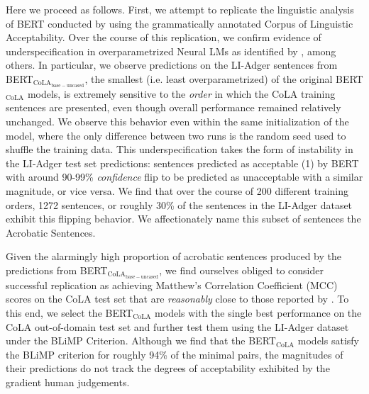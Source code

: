 Here we proceed as follows. First, we attempt to replicate the linguistic analysis of BERT conducted by \citet{warstadt2020can} using the grammatically annotated Corpus of Linguistic Acceptability.  Over the course of this replication, we confirm evidence of underspecification in overparametrized Neural LMs as identified by \citet{d2020underspecification,mccoy2019berts}, among others.  In particular, we observe predictions on the LI-Adger sentences from BERT$_\mathrm{CoLA_{base-uncased}}$, the smallest (i.e. least overparametrized) of the original BERT$_\mathrm{CoLA}$ models, is extremely sensitive to the {\em order} in which the CoLA training sentences are presented, even though overall performance remained relatively unchanged.  We observe this behavior even within the same initialization of the model, where the only difference between two runs is the random seed used to shuffle the training data.  This underspecification takes the form of instability in the LI-Adger test set predictions: sentences predicted as acceptable (1) by BERT with around 90-99\% \textit{confidence} flip to be predicted as unacceptable with a similar magnitude, or vice versa.  We find that over the course of 200 different training orders, 1272 sentences, or roughly 30\% of the sentences in the LI-Adger dataset exhibit this flipping behavior.  We affectionately name this subset of sentences the Acrobatic Sentences.

Given the alarmingly high proportion of acrobatic sentences produced by the predictions from BERT$_\mathrm{CoLA_{base-uncased}}$, we find ourselves obliged to consider successful replication as achieving Matthew's Correlation Coefficient (MCC) scores on the CoLA test set that are \textit{reasonably} close to those reported by \citet{warstadt2019blimp}.  To this end, we select the BERT$_\mathrm{CoLA}$ models with the single best performance on the CoLA out-of-domain test set and further test them using the LI-Adger dataset under the BLiMP Criterion.  Although we find that the BERT$_\mathrm{CoLA}$ models satisfy the BLiMP criterion for roughly 94\% of the minimal pairs, the magnitudes of their predictions do not track the degrees of acceptability exhibited by the gradient human judgements.  

